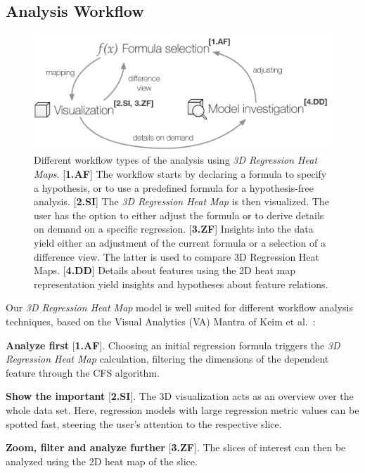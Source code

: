 \documentclass[journal]{style/vgtc} 			          %
\begin{document}
\subsection{Analysis Workflow} \label{sec:Workflow}
\begin{figure}[htb]
 \centering
 \includegraphics[width=1.0\linewidth]{figures/workflow}
 \caption{
 Different workflow types of the analysis using \emph{3D Regression Heat Maps}.
 [\textbf{1.AF}] The workflow starts by declaring a formula to specify a hypothesis, or to use a predefined formula for a hypothesis-free analysis.
 [\textbf{2.SI}] The \emph{3D Regression Heat Map} is then visualized.
 The user has the option to either adjust the formula or to derive details on demand on a specific regression.
 [\textbf{3.ZF}] Insights into the data yield either an adjustment of the current formula or a selection of a difference view.
 The latter is used to compare 3D Regression Heat Maps.
 [\textbf{4.DD}] Details about features using the 2D heat map representation yield insights and hypotheses about feature relations.
 }
  \label{fig:Workflow}
\end{figure}
\noindent Our \emph{3D Regression Heat Map} model is well suited for different workflow analysis techniques, based on the Visual Analytics (VA) Mantra of Keim et al.~\cite{Keim}:

\textbf{Analyze first} [\textbf{1.AF}]. Choosing an initial regression formula triggers the \emph{3D Regression Heat Map} calculation, filtering the dimensions of the dependent feature through the CFS algorithm.

\textbf{Show the important} [\textbf{2.SI}]. The 3D visualization acts as an overview over the whole data set.
Here, regression models with large regression metric values can be spotted fast, steering the user's attention to the respective slice.

\textbf{Zoom, filter and analyze further} [\textbf{3.ZF}]. The slices of interest can then be analyzed using the 2D heat map of the slice.
\end{document}
